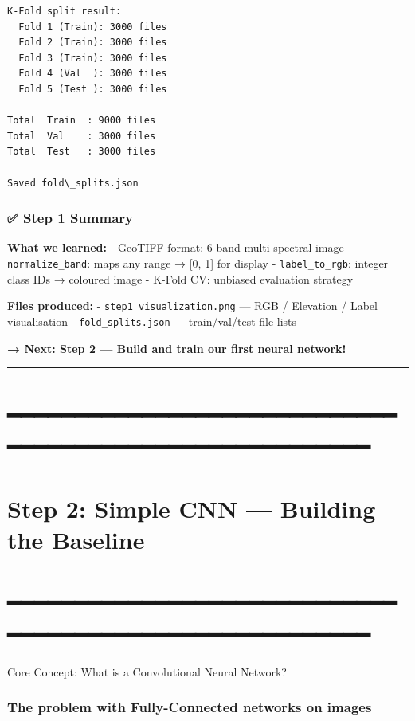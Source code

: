 \documentclass[11pt]{article}
\begin{document}
    \begin{Verbatim}[commandchars=\\\{\}]
K-Fold split result:
  Fold 1 (Train): 3000 files
  Fold 2 (Train): 3000 files
  Fold 3 (Train): 3000 files
  Fold 4 (Val  ): 3000 files
  Fold 5 (Test ): 3000 files

Total  Train  : 9000 files
Total  Val    : 3000 files
Total  Test   : 3000 files

Saved fold\_splits.json
    \end{Verbatim}

    \subsubsection{✅ Step 1 Summary}\label{step-1-summary}

\textbf{What we learned:} - GeoTIFF format: 6-band multi-spectral image
- \texttt{normalize\_band}: maps any range → {[}0, 1{]} for display -
\texttt{label\_to\_rgb}: integer class IDs → coloured image - K-Fold CV:
unbiased evaluation strategy

\textbf{Files produced:} - \texttt{step1\_visualization.png} --- RGB /
Elevation / Label visualisation - \texttt{fold\_splits.json} ---
train/val/test file lists

\textbf{→ Next: Step 2 --- Build and train our first neural network!}

    \begin{center}\rule{0.5\linewidth}{0.5pt}\end{center}

\section{━━━━━━━━━━━━━━━━━━━━━━━━━━━━━━━━━━━━━━━━━━━━━━━━━━━━━━━━}

\section{Step 2: Simple CNN --- Building the Baseline}\label{step-2-simple-cnn-building-the-baseline}

\section{━━━━━━━━━━━━━━━━━━━━━━━━━━━━━━━━━━━━━━━━━━━━━━━━━━━━━━━━}
{Core Concept: What is a Convolutional Neural
Network?}\label{core-concept-what-is-a-convolutional-neural-network}

\subsubsection{The problem with Fully-Connected networks on
images}\label{the-problem-with-fully-connected-networks-on-images}
\end{document}
